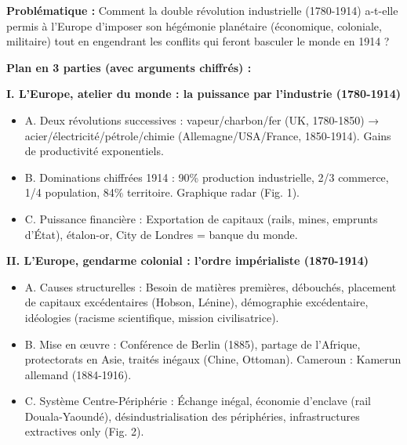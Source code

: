 \documentclass[11pt]{article}
\begin{document}
\begin{exoresolu}
\textbf{Problématique :} Comment la double révolution industrielle (1780-1914) a-t-elle permis à l'Europe d'imposer son hégémonie planétaire (économique, coloniale, militaire) tout en engendrant les conflits qui feront basculer le monde en 1914 ?

\textbf{Plan en 3 parties (avec arguments chiffrés) :}

\textbf{I. L'Europe, atelier du monde : la puissance par l'industrie (1780-1914)}
\begin{itemize}
    \item A. Deux révolutions successives : vapeur/charbon/fer (UK, 1780-1850) → acier/électricité/pétrole/chimie (Allemagne/USA/France, 1850-1914). Gains de productivité exponentiels.
    \item B. Dominations chiffrées 1914 : 90\% production industrielle, 2/3 commerce, 1/4 population, 84\% territoire. Graphique radar (Fig. 1).
    \item C. Puissance financière : Exportation de capitaux (rails, mines, emprunts d'État), étalon-or, City de Londres = banque du monde.
\end{itemize}

\textbf{II. L'Europe, gendarme colonial : l'ordre impérialiste (1870-1914)}
\begin{itemize}
    \item A. Causes structurelles : Besoin de matières premières, débouchés, placement de capitaux excédentaires (Hobson, Lénine), démographie excédentaire, idéologies (racisme scientifique, mission civilisatrice).
    \item B. Mise en œuvre : Conférence de Berlin (1885), partage de l'Afrique, protectorats en Asie, traités inégaux (Chine, Ottoman). Cameroun : Kamerun allemand (1884-1916).
    \item C. Système Centre-Périphérie : Échange inégal, économie d'enclave (rail Douala-Yaoundé), désindustrialisation des périphéries, infrastructures extractives only (Fig. 2).
\end{itemize}


\end{exoresolu}
\end{document}

